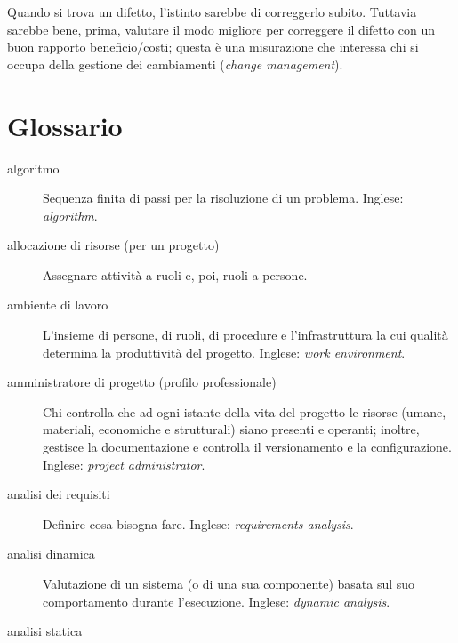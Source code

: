 \documentclass[a4paper]{article}
\begin{document}
Quando si trova un difetto, l'istinto sarebbe di correggerlo subito. Tuttavia sarebbe bene, prima, valutare il modo migliore per correggere il difetto con un buon rapporto beneficio/costi; questa è una misurazione che interessa chi si occupa della gestione dei cambiamenti (\emph{change management}).
	


		
	\newpage
	\appendix
	\section{Glossario}


		
	\begin{description}
		
			
	\item[algoritmo] 

			Sequenza finita di passi per la risoluzione di un problema. Inglese: \emph{algorithm}.
			
	\item[allocazione di risorse (per un progetto)] 

			Assegnare attività a ruoli e, poi, ruoli a persone.
			
	\item[ambiente di lavoro] 

			L'insieme di persone, di ruoli, di procedure e l'infrastruttura la cui qualità determina la produttività del progetto. Inglese: \emph{work environment}.
			
	\item[amministratore di progetto (profilo professionale)] 

			Chi controlla che ad ogni istante della vita del progetto le risorse (umane, materiali, economiche e strutturali) siano presenti e operanti; inoltre, gestisce la documentazione e controlla il versionamento e la configurazione. Inglese: \emph{project administrator}.
			
	\item[analisi dei requisiti] 

			Definire cosa bisogna fare. Inglese: \emph{requirements analysis}.
			
	\item[analisi dinamica] 

			Valutazione di un sistema (o di una sua componente) basata sul suo comportamento durante l'esecuzione. Inglese: \emph{dynamic analysis}.
			
	\item[analisi statica] 


\end{description}
\end{document}
